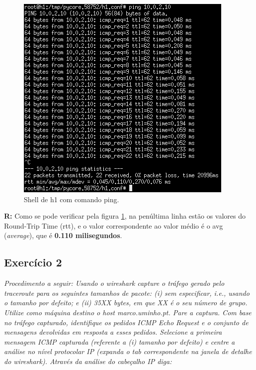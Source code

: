 \documentclass{llncs}
\begin{document}
\begin{figure}[H]
\begin{center}
\includegraphics[scale=0.54]{shell_d.png} 
\end{center}
\caption{\label{fig:shell_d}Shell de h1 com comando ping.}
\end{figure}

\textbf{R:} Como se pode verificar pela figura \ref{fig:shell_d}, na penúltima linha estão os valores do Round-Trip Time (rtt), e o valor correspondente ao valor médio é o avg (\emph{average}), que é \textbf{0.110 milisegundos}.

\subsection{Exercício 2}
\emph{Procedimento a seguir: Usando o wireshark capture o tráfego gerado pelo traceroute para os seguintes tamanhos de pacote: (i) sem especificar, i.e., usando o tamanho por defeito; e (ii) 35XX bytes, em que XX é o seu número de grupo. Utilize como máquina destino o host marco.uminho.pt. Pare a captura. Com base no tráfego capturado, identifique os pedidos ICMP Echo  Request e o conjunto de mensagens devolvidas em resposta a esses pedidos. Selecione a primeira mensagem ICMP capturada (referente a (i) tamanho por defeito) e centre a análise no nível protocolar IP (expanda o tab correspondente na janela de detalhe do wireshark). Através da análise do cabeçalho IP diga: }
\end{document}
